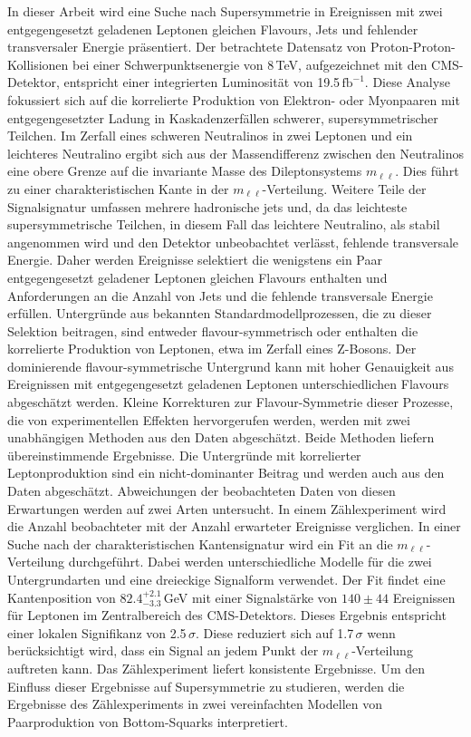 In dieser Arbeit wird eine Suche nach Supersymmetrie in Ereignissen mit zwei entgegengesetzt geladenen Leptonen gleichen Flavours, Jets und fehlender transversaler Energie pr\"asentiert. Der betrachtete Datensatz von Proton-Proton-Kollisionen bei einer Schwerpunktsenergie von 8\,TeV, aufgezeichnet mit den CMS-Detektor, entspricht einer integrierten Luminosit\"at von 19.5\,$\mathrm{fb}^{-1}$. Diese Analyse fokussiert sich auf die korrelierte Produktion von Elektron- oder Myonpaaren mit entgegengesetzter Ladung in Kaskadenzerf\"allen schwerer, supersymmetrischer Teilchen. Im Zerfall eines schweren Neutralinos in zwei Leptonen und ein leichteres Neutralino ergibt sich aus der Massendifferenz zwischen den Neutralinos eine obere Grenze auf die invariante Masse des Dileptonsystems $m_{\ell\ell}$. Dies f\"uhrt zu einer charakteristischen Kante in der $m_{\ell\ell}$-Verteilung. Weitere Teile der Signalsignatur umfassen mehrere hadronische jets und, da das leichteste supersymmetrische Teilchen, in diesem Fall das leichtere Neutralino, als stabil angenommen wird und den Detektor unbeobachtet verl\"asst, fehlende transversale Energie. Daher werden Ereignisse selektiert die wenigstens ein Paar entgegengesetzt geladener Leptonen gleichen Flavours enthalten und Anforderungen an die Anzahl von Jets und die fehlende transversale Energie erf\"ullen. Untergr\"unde aus bekannten Standardmodellprozessen, die zu dieser Selektion beitragen, sind entweder flavour-symmetrisch oder enthalten die korrelierte Produktion von Leptonen, etwa im Zerfall eines $\mathrm{Z}$-Bosons. Der dominierende flavour-symmetrische Untergrund kann mit hoher Genauigkeit aus Ereignissen mit entgegengesetzt geladenen Leptonen unterschiedlichen Flavours abgesch\"atzt werden. Kleine Korrekturen zur Flavour-Symmetrie dieser Prozesse, die von experimentellen Effekten hervorgerufen werden, werden mit zwei unabh\"angigen Methoden aus den Daten abgesch\"atzt. Beide Methoden liefern \"ubereinstimmende Ergebnisse. Die Untergr\"unde mit korrelierter Leptonproduktion sind ein nicht-dominanter Beitrag und werden auch aus den Daten abgesch\"atzt. Abweichungen der beobachteten Daten von diesen Erwartungen werden auf zwei Arten untersucht. In einem Z\"ahlexperiment wird die Anzahl beobachteter mit der Anzahl erwarteter Ereignisse verglichen. In einer Suche nach der charakteristischen Kantensignatur wird ein Fit an die $m_{\ell\ell}$-Verteilung durchgef\"uhrt. Dabei werden unterschiedliche Modelle f\"ur die zwei Untergrundarten und eine dreieckige Signalform verwendet. Der Fit findet eine Kantenposition von $82.4^{+2.1}_{-3.3}$\,GeV mit einer Signalst\"arke von $140\pm44$ Ereignissen f\"ur Leptonen im Zentralbereich des CMS-Detektors. Dieses Ergebnis entspricht einer lokalen Signifikanz von 2.5\,$\sigma$. Diese reduziert sich auf 1.7\,$\sigma$ wenn ber\"ucksichtigt wird, dass ein Signal an jedem Punkt der $m_{\ell\ell}$-Verteilung auftreten kann. Das Z\"ahlexperiment liefert konsistente Ergebnisse. Um den Einfluss dieser Ergebnisse auf Supersymmetrie zu studieren, werden die Ergebnisse des Z\"ahlexperiments in zwei vereinfachten Modellen von Paarproduktion von Bottom-Squarks interpretiert. 
\clearpage